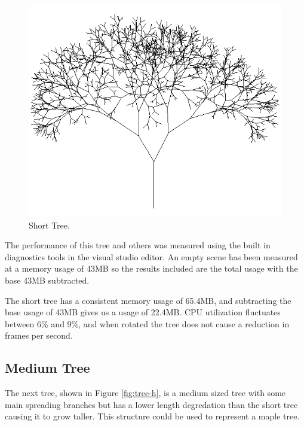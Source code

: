 \documentclass[final]{cmpreport}
\begin{document}
\begin{figure}[ht]
    \includegraphics[scale=0.7]{tree-g.PNG} 
    \centering
    \captionsetup{justification=centering}
    \caption{Short Tree.}
    \label{fig:tree-g}
\end{figure}

The performance of this tree and others was measured using the built in diagnostics tools in 
the visual studio editor. An empty scene has been measured at a memory usage of 43MB so the 
results included are the total usage with the base 43MB subtracted. 

The short tree has a consistent memory usage of 65.4MB, and subtracting the base usage of 43MB gives 
us a usage of 22.4MB. CPU utilization fluctuates between 6\% and 9\%, and when rotated the tree 
does not cause a reduction in frames per second.

\subsection{Medium Tree}
The next tree, shown in Figure \ref{fig:tree-h}, is a medium sized tree with some main spreading 
branches but has a lower length degredation than the short tree causing it to grow taller. This 
structure could be used to represent a maple tree.
\end{document}
